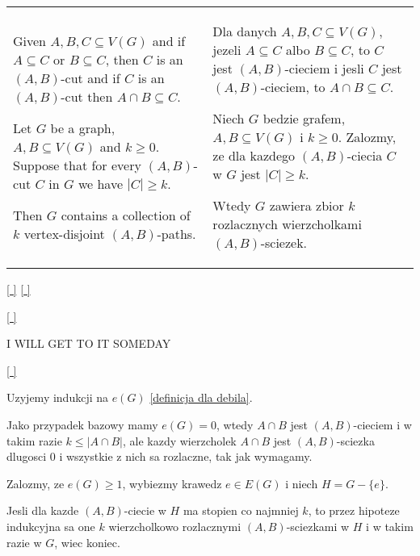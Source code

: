 \begin{tabularx}{\textwidth}{ X!{\color{git90gray}\vrule} X}

    Given $A,B,C\subseteq V(G)$ and if $A\subseteq C$ or $B\subseteq C$, then $C$ is an $(A,B)$-cut and if $C$ is an $(A,B)$-cut then $A\cap B\subseteq C$.
    \bigskip

    Let $G$ be a graph, $A,B\subseteq V(G)$ and $k\geq0$. Suppose that for every $(A,B)$-cut $C$ in $G$ we have $|C|\geq k$. 

    Then $G$ contains a collection of $k$ vertex-disjoint $(A,B)$-paths.

    &

    Dla danych $A,B,C\subseteq V(G)$, jezeli $A\subseteq C$ albo $B\subseteq C$, to $C$ jest $(A,B)$-cieciem i jesli $C$ jest $(A,B)$-cieciem, to $A\cap B\subseteq C$.
    \bigskip

    Niech $G$ bedzie grafem, $A,B\subseteq V(G)$ i $k\geq0$. Zalozmy, ze dla kazdego $(A,B)$-ciecia $C$ w $G$ jest $|C|\geq k$.

    Wtedy $G$ zawiera zbior $k$ rozlacznych wierzcholkami $(A,B)$-sciezek.

\end{tabularx}

\hyperref[vertex-disjoined-lemma-GB]{[ ]} \hyperref[vertex-disjoined-lemma-PL]{[ ]}
\label{vertex-disjoined-lemma-LAN}

\medskip

\hyperref[vertex-disjoined-lemma-LAN]{[ ]}
\label{vertex-disjoined-lemma-GB}
\medskip

{\color{cyan}I WILL GET TO IT SOMEDAY}

\hyperref[vertex-disjoined-lemma-LAN]{[ ]}
\label{vertex-disjoined-lemma-PL}
\medskip


Uzyjemy indukcji na $e(G)$ \hyperref[handshaking-lemma]{[definicja dla debila]}.
\smallskip

Jako przypadek bazowy mamy $e(G)=0$, wtedy $A\cap B$ jest $(A,B)$-cieciem i w takim razie $k\leq |A\cap B|$, ale kazdy wierzcholek $A\cap B$ jest $(A,B)$-sciezka dlugosci 0 i wszystkie z nich sa rozlaczne, tak jak wymagamy.
\medskip

Zalozmy, ze $e(G)\geq 1$, wybiezmy krawedz $e\in E(G)$ i niech $H=G-\{e\}$. 
\smallskip

Jesli dla kazde $(A,B)$-ciecie w $H$ ma stopien co najmniej $k$, to przez hipoteze indukcyjna sa one $k$ wierzcholkowo rozlacznymi $(A,B)$-sciezkami w $H$ i w takim razie w $G$, wiec koniec.
\smallskip

